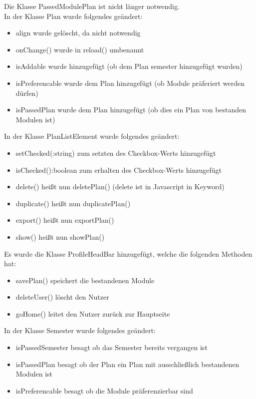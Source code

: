 Die Klasse PassedModulePlan ist nicht länger notwendig.\\
In der Klasse Plan wurde folgendes geändert:
\begin{itemize}
	\item align wurde gelöscht, da nicht notwendig
	\item onChange() wurde in reload() umbenannt
	\item isAddable wurde hinzugefügt (ob dem Plan semester hinzugefügt wurden)
	\item isPreferencable wurde dem Plan hinzugefügt (ob Module präferiert werden dürfen)
	\item isPassedPlan wurde dem Plan hinzugefügt (ob dies ein Plan von bestanden Modulen ist)
\end{itemize}

In der Klasse PlanListElement wurde folgendes geändert:
\begin{itemize}
	\item setChecked(:string) zum setzten des Checkbox-Werts hinzugefügt
	\item isChecked():boolean zum erhalten des Checkbox-Werts hinzugefügt
	\item delete() heißt nun deletePlan() (delete ist in Javascript in Keyword)
	\item duplicate() heißt nun duplicatePlan()
	\item export() heißt nun exportPlan()
	\item show() heißt nun showPlan()
\end{itemize}

Es wurde die Klasse ProfileHeadBar hinzugefügt, welche die folgenden Methoden hat:
\begin{itemize}
	\item savePlan() speichert die bestandenen Module
	\item deleteUser() löscht den Nutzer
	\item goHome() leitet den Nutzer zurück zur Hauptseite
\end{itemize}

In der Klasse Semester wurde folgendes geändert:
\begin{itemize}
	\item isPassedSemester besagt ob das Semester bereits vergangen ist
	\item isPassedPlan besagt ob der Plan ein Plan mit ausschließlich bestandenen Modulen ist
	\item isPreferencable besagt ob die Module präferenzierbar sind
\end{itemize}